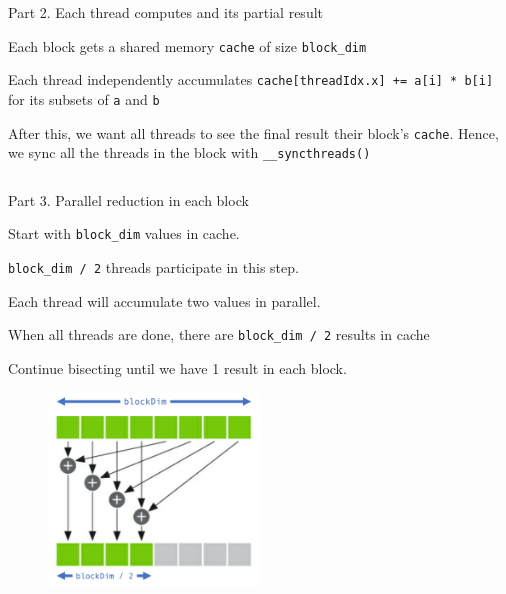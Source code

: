 \documentclass{beamer}
\begin{document}
    \begin{frame}{Part 2. Each thread computes and its partial result}
        \begin{itemize}
        {\footnotesize
        \item Each block gets a shared memory \texttt{cache} of size \texttt{block\_dim}
        \item Each thread independently accumulates \texttt{cache[threadIdx.x] += a[i] * b[i]} for its subsets of \texttt{a} and \texttt{b}
        \item After this, we want all threads to see the final result their block's \texttt{cache}.  Hence, we sync all the threads in the block with \texttt{\_\_syncthreads()}
        }
        \end{itemize}
        \begin{block}{}
            \inputminted[fontsize=\footnotesize]{cuda}{src/dot_snippet_02.cu}
        \end{block}
    \end{frame}

    \begin{frame}{Part 3.  Parallel reduction in each block}
        \begin{enumerate}
        {\footnotesize
            \item Start with \texttt{block\_dim} values in cache.
            \item \texttt{block\_dim / 2} threads participate in this step.
            \item Each thread will accumulate two values in parallel.
            \item When all threads are done, there are \texttt{block\_dim / 2} results in cache
            \item Continue bisecting until we have 1 result in each block.
        }
        \end{enumerate}
        \begin{figure}
            \centering
            \includegraphics[width=0.5\textwidth]{img/04/parallel-reduc-annotated.png}
        \end{figure}
    \end{frame}
\end{document}
